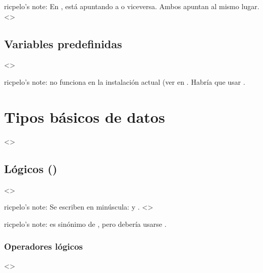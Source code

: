 \documentclass[a4paper,12pt,spanish]{sphinxmanual}
\begin{document}
ricpelo’s note: En ,   está apuntando a 
o viceversa. Ambos apuntan al mismo
lugar. \textless{}\textgreater{}


\subsection{Variables predefinidas}
\label{\detokenize{php:variables-predefinidas}}
\textless{}\textgreater{}

ricpelo’s note:  no funciona en la instalación actual (ver
 en . Habría que usar .


\section{Tipos básicos de datos}
\label{\detokenize{php:tipos-basicos-de-datos}}
\textless{}\textgreater{}


\subsection{Lógicos ()}
\label{\detokenize{php:logicos-bool}}
\textless{}\textgreater{}

\begin{DUlineblock}{0em}
\item[] ricpelo’s note: Se escriben en minúscula:  y
. \textless{}\textgreater{}
\item[] ricpelo’s note:  es sinónimo de , pero debería
usarse .
\end{DUlineblock}


\subsubsection{Operadores lógicos}
\label{\detokenize{php:operadores-logicos}}
\textless{}\textgreater{}
\end{document}
